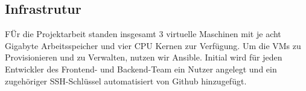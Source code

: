 \subsection{Infrastrutur}
FÜr die Projektarbeit standen insgesamt 3 virtuelle Maschinen mit je acht Gigabyte Arbeitsspeicher und vier CPU Kernen zur Verfügung.
Um die VMs zu Provisionieren und zu Verwalten, nutzen wir Ansible.
Initial wird für jeden Entwickler des Frontend- und Backend-Team ein Nutzer angelegt und ein zugehöriger SSH-Schlüssel automatisiert von Github hinzugefügt.
